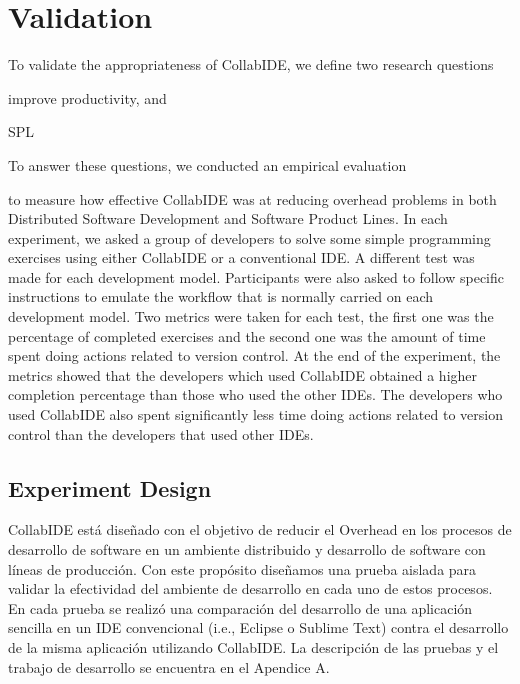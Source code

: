 

\section{Validation}
\label{sec:validation}

To validate the appropriateness of CollabIDE, we define two research questions
\begin{enumerate*}[label=(\arabic*)]
\item improve productivity, and
\item SPL
\end{enumerate*} 
To answer these questions, we conducted an empirical evaluation 

to measure how effective CollabIDE was at reducing overhead problems 
in both Distributed Software Development and Software Product Lines. In each experiment, we asked 
a group of developers to solve some simple programming exercises using either CollabIDE or a 
conventional IDE. A different test was made for each development model. Participants were also 
asked to follow specific instructions to emulate the workflow that is normally carried on each 
development model. Two metrics were taken for each test, the first one was the percentage of 
completed exercises and the second one was the amount of time spent doing actions related to 
version control.
At the end of the experiment, the metrics showed that the developers which used CollabIDE obtained 
a higher completion percentage than those who used the other IDEs. The developers who used 
CollabIDE also spent significantly less time doing actions related to version control than the 
developers that used other IDEs.

\subsection{Experiment Design}

CollabIDE está diseñado con el objetivo de reducir el Overhead en los procesos de desarrollo de software en un ambiente distribuido y desarrollo de software con líneas de producción. Con este propósito diseñamos una prueba aislada para validar la efectividad del ambiente de desarrollo en cada uno de estos procesos. En cada prueba se realizó una comparación del desarrollo de una aplicación sencilla en un IDE convencional (i.e., Eclipse o Sublime Text) contra el desarrollo de la misma aplicación utilizando CollabIDE. La descripción de las pruebas y el trabajo de desarrollo se encuentra en el Apendice A.

